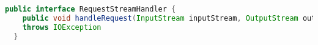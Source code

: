 \begin{lstlisting}[language=java, frame=trBL, label=code:lambdalisting, float=ht, caption = {AWS Lambda Interface}]
  public interface RequestStreamHandler {
    public void handleRequest(InputStream inputStream, OutputStream outputStream, Context context)
    throws IOException
  }
\end{lstlisting}

